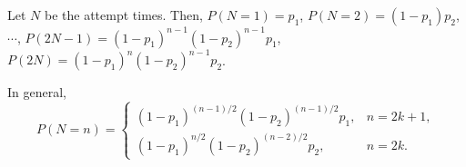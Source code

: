 \documentclass[14pt]{elegantbook}
\begin{document}
    \begin{solution}
        Let $N$ be the attempt times. Then, 
        $P(N=1)=p_1$, $P(N=2)=(1-p_1)p_2$, $\cdots$, $P(2N-1)=(1-p_1)^{n-1}(1-p_2)^{n-1}p_1$, $P(2N)=(1-p_1)^n(1-p_2)^{n-1}p_2$. 

        In general,
        \[
            P(N=n)=\left\{ \begin{matrix}
                (1-p_1)^{(n-1)/2}(1-p_2)^{(n-1)/2}p_1, & n=2k+1, \\
                (1-p_1)^{n/2}(1-p_2)^{(n-2)/2}p_2, & n=2k. 
            \end{matrix} \right.
        \]
    \end{solution}

    
\end{document}
